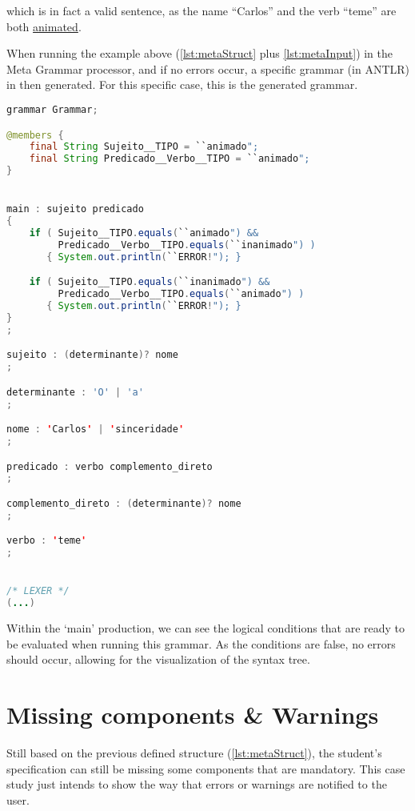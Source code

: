 \noindent which is in fact a valid sentence, as the name ``Carlos'' and the verb ``teme'' are both \underline{animated}.

When running the example above (\autoref{lst:metaStruct} plus \autoref{lst:metaInput}) in the Meta Grammar processor, and if no errors occur, a specific grammar (in ANTLR) 
in then generated. For this specific case, this is the generated grammar.

\begin{center}
\begin{minipage}{10cm}
\begin{lstlisting}[language=java, basicstyle=\tiny, label={lst:case_study_sentence}, caption=Example of a specific generated grammar.]
grammar Grammar;

@members {
    final String Sujeito__TIPO = ``animado";
    final String Predicado__Verbo__TIPO = ``animado";
}


main : sujeito predicado
{
    if ( Sujeito__TIPO.equals(``animado") &&
         Predicado__Verbo__TIPO.equals(``inanimado") ) 
       { System.out.println(``ERROR!"); }

    if ( Sujeito__TIPO.equals(``inanimado") &&
         Predicado__Verbo__TIPO.equals(``animado") ) 
       { System.out.println(``ERROR!"); }
}
;

sujeito : (determinante)? nome 
;

determinante : 'O' | 'a'
;

nome : 'Carlos' | 'sinceridade'
;

predicado : verbo complemento_direto 
;

complemento_direto : (determinante)? nome 
;

verbo : 'teme'
;


/* LEXER */
(...)
\end{lstlisting}
\end{minipage}
\end{center}

Within the ‘main’ production, we can see the logical conditions that are ready to be evaluated when running this grammar. As the conditions are false, no errors should occur,
allowing for the visualization of the syntax tree.



\section{Missing components \& Warnings}
Still based on the previous defined structure (\autoref{lst:metaStruct}), the student's specification can still be missing some components that are mandatory. 
This case study just intends to show the way that errors or warnings are notified to the user.

